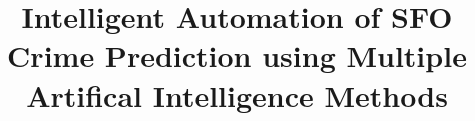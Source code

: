 \documentclass[10 pt,conference,final,]{IEEEtran}
\begin{document}
%
\title{Intelligent Automation of SFO Crime Prediction using Multiple
Artifical Intelligence Methods}


\author{











}


%
\end{document}
